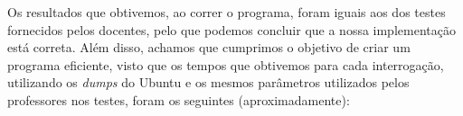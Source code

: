 \documentclass[a4paper, 11pt, oneside]{article}
\begin{document}
Os resultados que obtivemos, ao correr o programa, foram iguais aos dos testes fornecidos pelos docentes, pelo que podemos concluir que a nossa implementação está correta. Além disso, achamos que cumprimos o objetivo de criar um programa eficiente, visto que os tempos que obtivemos para cada interrogação, utilizando os \textit{dumps} do Ubuntu e os mesmos parâmetros utilizados pelos professores nos testes, foram os seguintes (aproximadamente):
\begin{table}[h]
\centering
\caption{Tempos de Execução - input nº 1}
\end{table}

\begin{table}[h]
\centering
\caption{Tempos de Execução - input nº 2}
\end{table}
\end{document}
